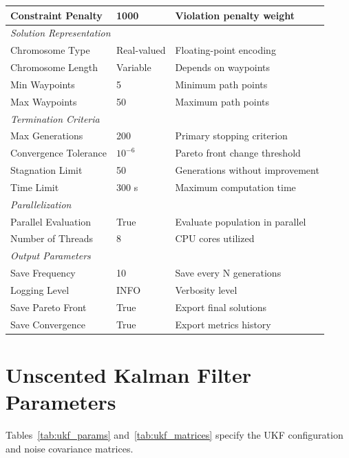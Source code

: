 \begin{table}[htbp]
\begin{tabular}{@{}lll@{}}
Constraint Penalty & 1000 & Violation penalty weight \\
\midrule
\multicolumn{3}{l}{\textit{Solution Representation}} \\
Chromosome Type & Real-valued & Floating-point encoding \\
Chromosome Length & Variable & Depends on waypoints \\
Min Waypoints & 5 & Minimum path points \\
Max Waypoints & 50 & Maximum path points \\
\midrule
\multicolumn{3}{l}{\textit{Termination Criteria}} \\
Max Generations & 200 & Primary stopping criterion \\
Convergence Tolerance & $10^{-6}$ & Pareto front change threshold \\
Stagnation Limit & 50 & Generations without improvement \\
Time Limit & 300 s & Maximum computation time \\
\midrule
\multicolumn{3}{l}{\textit{Parallelization}} \\
Parallel Evaluation & True & Evaluate population in parallel \\
Number of Threads & 8 & CPU cores utilized \\
\midrule
\multicolumn{3}{l}{\textit{Output Parameters}} \\
Save Frequency & 10 & Save every N generations \\
Logging Level & INFO & Verbosity level \\
Save Pareto Front & True & Export final solutions \\
Save Convergence & True & Export metrics history \\
\bottomrule
\end{tabular}
\end{table}

\clearpage

\section{Unscented Kalman Filter Parameters}
\label{sec:ukf_params}

Tables~\ref{tab:ukf_params} and~\ref{tab:ukf_matrices} specify the UKF configuration and noise covariance matrices.

